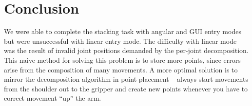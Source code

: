 \section{Conclusion}\label{sec:conclusion}
We were able to complete the stacking task with angular and GUI entry modes but were unsuccessful with linear entry mode.
The difficulty with linear mode was the result of invalid joint positions demanded by the per-joint decomposition.
This naive method for solving this problem is to store more points, since errors arise from the composition of many movements.
A more optimal solution is to mirror the decomposition algorithm in point placement -- always start movements from the shoulder out to the gripper and create new points whenever you have to correct movement ``up'' the arm.
